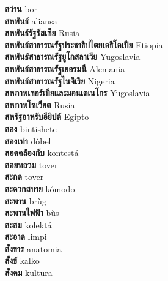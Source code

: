 \textbf{ สว่าน  } bor \\
\textbf{ สหพันธ์  } aliansa \\
\textbf{ สหพันธ์รัฐรัสเซีย  } Rusia \\
\textbf{ สหพันธ์สาธารณรัฐประชาธิปไตยเอธิโอเปีย  } Etiopia \\
\textbf{ สหพันธ์สาธารณรัฐยูโกสลาเวีย  } Yugoslavia \\
\textbf{ สหพันธ์สาธารณรัฐเยอรมนี  } Alemania \\
\textbf{ สหพันธ์สาธารณรัฐไนจีเรีย  } Nigeria \\
\textbf{ สหภาพเซอร์เบียและมอนเตเนโกร  } Yugoslavia \\
\textbf{ สหภาพโซเวียต  } Rusia \\
\textbf{ สหรัฐอาหรับอียิปต์  } Egipto \\
\textbf{ สอง  } bintishete \\
\textbf{ สองเท่า  } dòbel \\
\textbf{ สอดคล้องกับ  } kontestá \\
\textbf{ สอยหลวม  } tover \\
\textbf{ สะกด  } tover \\
\textbf{ สะดวกสบาย  } kómodo \\
\textbf{ สะพาน  } brùg \\
\textbf{ สะพานไฟฟ้า  } bùs \\
\textbf{ สะสม  } kolektá \\
\textbf{ สะอาด  } limpi \\
\textbf{ สังขาร  } anatomia \\
\textbf{ สังข์  } kalko \\
\textbf{ สังคม  } kultura \\
